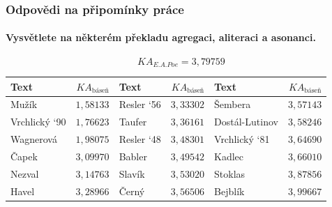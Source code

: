 \documentclass[12pt,xcolor=usenames,dvipsnames]{beamer}
\begin{document}
\begin{frame}
	\frametitle{Odpovědi na připomínky práce}
	\framesubtitle{Vysvětlete na některém překladu agregaci, \textbf{aliteraci} a asonanci.}

	\begin{equation*}
		{K\!A}_{E.A.Poe} = 3{,}79759
	\end{equation*}
{\footnotesize 
	\begin{tabular}{|lr|lr|lr|}
\hline \bfseries Text & \bfseries $KA_{\text{báseň}}$ & \bfseries Text & \bfseries $KA_{\text{báseň}}$ & \bfseries Text & \bfseries $KA_{\text{báseň}}$ \\ 
\hline Mužík          & $1{,}58133$                   & Resler ‘56     & $3{,}33302$                   & Šembera        & $3{,}57143$ \\ 
\hline Vrchlický ‘90  & $1{,}76623$                   & Taufer         & $3{,}36161$                   & Dostál-Lutinov & $3{,}58246$ \\ 
\hline Wagnerová      & $1{,}98075$                   & Resler ‘48     & $3{,}48301$                   & Vrchlický ‘81  & $3{,}64690$ \\ 
\hline Čapek          & $3{,}09970$                   & Babler         & $3{,}49542$                   & Kadlec         & $3{,}66010$ \\ 
\hline Nezval         & $3{,}14763$                   & Slavík         & $3{,}53020$                   & Stoklas        & $3{,}87856$ \\ 
\hline Havel          & $3{,}28966$                   & Černý          & $3{,}56506$                   & Bejblík        & $3{,}99667$ \\ 
\hline 
\end{tabular} 
}

\end{frame}


\end{document}
